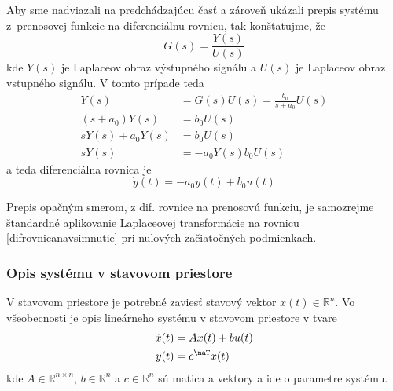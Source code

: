 \documentclass[a4paper, 10pt, ]{article}
\begin{document}
Aby sme nadviazali na predchádzajúcu časť a zároveň ukázali prepis systému z~prenosovej funkcie na diferenciálnu rovnicu, tak konštatujme, že
\begin{equation}
    G(s) = \frac{Y(s)}{U(s)}
\end{equation}
kde $Y(s)$ je Laplaceov obraz výstupného signálu a $U(s)$ je Laplaceov obraz vstupného signálu. V tomto prípade teda
\begin{subequations}
\begin{align}
    Y(s) &= G(s) U(s) = \frac{b_0}{s + a_0} U(s) \\
    \left(s + a_0\right) Y(s) &= b_0 U(s) \\
    s Y(s) + a_0 Y(s) &= b_0 U(s) \\
    s Y(s)  &= -  a_0 Y(s) b_0 U(s) 
\end{align}
\end{subequations}
a teda diferenciálna rovnica je
\begin{equation} \label{difrovnicanavsimnutie}
    \dot y(t) = - a_0 y(t) + b_0 u(t)
\end{equation}

Prepis opačným smerom, z dif. rovnice na prenosovú funkciu, je samozrejme štandardné aplikovanie Laplaceovej transformácie na rovnicu \eqref{difrovnicanavsimnutie} pri nulových začiatočných podmienkach. 





\subsubsection{Opis systému v stavovom priestore}

V stavovom priestore je potrebné zaviesť stavový vektor $x(t) \in \mathbb R^n$. Vo všeobecnosti je opis lineárneho systému v stavovom priestore v tvare
\begin{subequations}
\begin{align}
    \dot x(t) &= A x(t) + b u(t) \\
    y(t) &= c^\naT x(t) 
\end{align}
\end{subequations}
kde $A \in \mathbb R^{n \times n}$, $b \in \mathbb R^n$ a $c \in \mathbb R^n$ sú matica a vektory a ide o parametre systému. 
\end{document}
